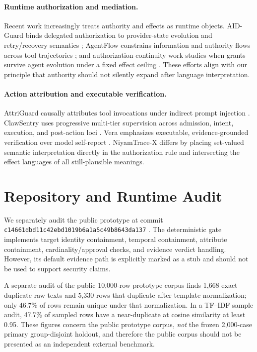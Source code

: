 \paragraph{Runtime authorization and mediation.}
Recent work increasingly treats authority and effects as runtime objects. AID-Guard binds delegated authorization to provider-state evolution and retry/recovery semantics \cite{aidguard2026}; AgentFlow constrains information and authority flows across tool trajectories \cite{agentflow2026}; and authorization-continuity work studies when grants survive agent evolution under a fixed effect ceiling \cite{authcontinuity2026}. These efforts align with our principle that authority should not silently expand after language interpretation.

\paragraph{Action attribution and executable verification.}
AttriGuard causally attributes tool invocations under indirect prompt injection \cite{attriguard2026}. ClawSentry uses progressive multi-tier supervision across admission, intent, execution, and post-action loci \cite{clawsentry2026}. Vera emphasizes executable, evidence-grounded verification over model self-report \cite{vera2026}. NiyamTrace-X differs by placing set-valued semantic interpretation directly in the authorization rule and intersecting the effect languages of all still-plausible meanings.

\section{Repository and Runtime Audit}
\label{sec:audit}

We separately audit the public prototype at commit \texttt{c14661dbd11c42ebd1019b6a1a5c49b8643da137} \cite{niyamtrace_repo}. The deterministic gate implements target identity containment, temporal containment, attribute containment, cardinality/approval checks, and evidence verdict handling. However, its default evidence path is explicitly marked as a stub and should not be used to support security claims.

A separate audit of the public 10,000-row prototype corpus finds 1,668 exact duplicate raw texts and 5,330 rows that duplicate after template normalization; only 46.7\% of rows remain unique under that normalization. In a TF--IDF sample audit, 47.7\% of sampled rows have a near-duplicate at cosine similarity at least 0.95. These figures concern the public prototype corpus, \emph{not} the frozen 2,000-case primary group-disjoint holdout, and therefore the public corpus should not be presented as an independent external benchmark.

